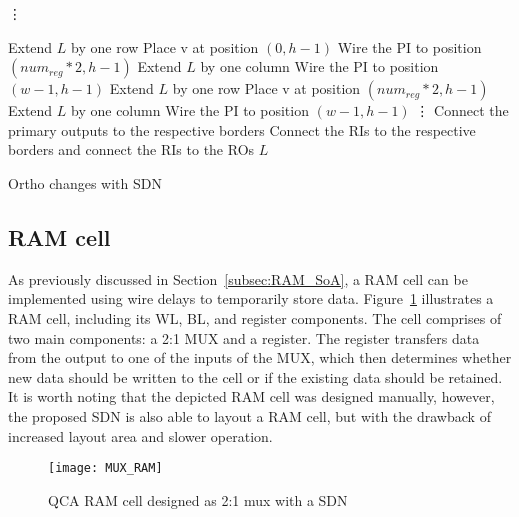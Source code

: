 \begin{algorithm}[H]
	\vdots
	
	\begin{algorithmic}
		{
			\State Extend $L$ by one row
			\State Place v at position $(0, h - 1)$
			\State Wire the PI to position $(num_{reg}*2, h - 1)$ 
			\State Extend $L$ by one column
			\State Wire the PI to position $(w - 1, h - 1)$ 
			\EndIf
		}
		{
			\State Extend $L$ by one row
			\State Place v at position $(num_{reg}*2, h - 1)$
			\State Extend $L$ by one column
			\State Wire the PI to position $(w - 1, h - 1)$ 
			\EndIf
		}
		\State\vdots
		\EndIf
		\State Connect the primary outputs to the respective borders
		\State Connect the RIs to the respective borders and connect the RIs to the ROs
		\Return $L$
		
		
	\end{algorithmic}
	\caption{Ortho changes with SDN}\label{alg:seq_network}
\end{algorithm}

\subsection{RAM cell}
As previously discussed in Section~\ref{subsec:RAM_SoA}, a RAM cell can be implemented using wire delays to temporarily store data. Figure~\ref{fig:QCA_RAM} illustrates a RAM cell, including its WL, BL, and register components. The cell comprises of two main components: a 2:1 MUX and a register. The register transfers data from the output to one of the inputs of the MUX, which then determines whether new data should be written to the cell or if the existing data should be retained. It is worth noting that the depicted RAM cell was designed manually, however, the proposed SDN is also able to layout a RAM cell, but with the drawback of increased layout area and slower operation.

\begin{figure}
	\centering
	\texttt{[image: MUX\_RAM]}
	
	\caption{QCA RAM cell designed as 2:1 mux with a SDN}\label{fig:QCA_RAM}
\end{figure}